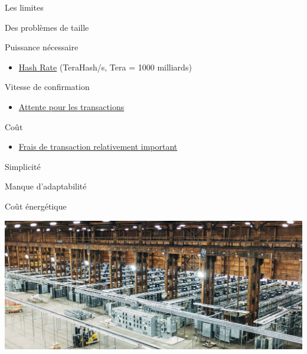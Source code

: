 \documentclass[presentation]{beamer}
\begin{document}
\begin{frame}[label={sec:org7eec08b}]{Les limites}
\begin{block}{Des problèmes de taille}
\begin{block}{Puissance nécessaire}
\begin{itemize}
\item \href{https://www.blockchain.com/fr/charts/hash-rate}{Hash Rate}  (TeraHash/s, Tera = 1000 milliards)
\end{itemize}
\end{block}
\begin{block}{Vitesse de confirmation}
\begin{itemize}
\item \href{https://www.blockchain.com/explorer/charts/median-confirmation-time}{Attente pour les transactions}
\end{itemize}
\end{block}
\begin{block}{Coût}
\begin{itemize}
\item \href{https://www.blockchain.com/explorer/charts/fees-usd-per-transaction}{Frais de transaction relativement important}
\end{itemize}
\end{block}

\begin{block}{Simplicité}
\end{block}
\begin{block}{Manque d'adaptabilité}
\end{block}
\end{block}

\begin{block}{Coût énergétique}
\begin{center}
\includegraphics[width=\textwidth]{Pictures/mining-farm-bitcoin.jpg}
\end{center}
\end{block}


\end{frame}
\end{document}
